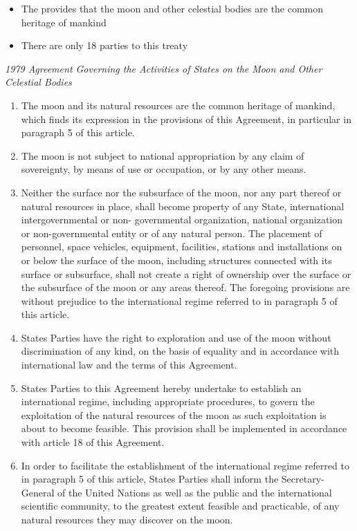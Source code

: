 \begin{itemize}
    \item The  provides that the moon and other celestial bodies are the common heritage of mankind
    \item There are only 18 parties to this treaty
\end{itemize}

\begin{conventiondetails}{\textit{1979 Agreement Governing the Activities of States on the Moon and Other Celestial Bodies}}
    \flushleft
    \begin{enumerate}
        \item The moon and its natural resources are the common heritage of mankind, which finds its expression in the provisions of this Agreement, in particular in paragraph 5 of this article.
        \item The moon is not subject to national appropriation by any claim of sovereignty, by means of use or occupation, or by any other means.
        \item Neither the surface nor the subsurface of the moon, nor any part thereof or natural resources in place, shall become property of any State, international intergovernmental or non- governmental organization, national organization or non-governmental entity or of any natural person. The placement of personnel, space vehicles, equipment, facilities, stations and installations on or below the surface of the moon, including structures connected with its surface or subsurface, shall not create a right of ownership over the surface or the subsurface of the moon or any areas thereof. The foregoing provisions are without prejudice to the international regime referred to in paragraph 5 of this article.
        \item States Parties have the right to exploration and use of the moon without discrimination of any kind, on the basis of equality and in accordance with international law and the terms of this Agreement.
        \item States Parties to this Agreement hereby undertake to establish an international regime, including appropriate procedures, to govern the exploitation of the natural resources of the moon as such exploitation is about to become feasible. This provision shall be implemented in accordance with article 18 of this Agreement.
        \item In order to facilitate the establishment of the international regime referred to in paragraph 5 of this article, States Parties shall inform the Secretary-General of the United Nations as well as the public and the international scientific community, to the greatest extent feasible and practicable, of any natural resources they may discover on the moon.

\end{enumerate}
\end{conventiondetails}
